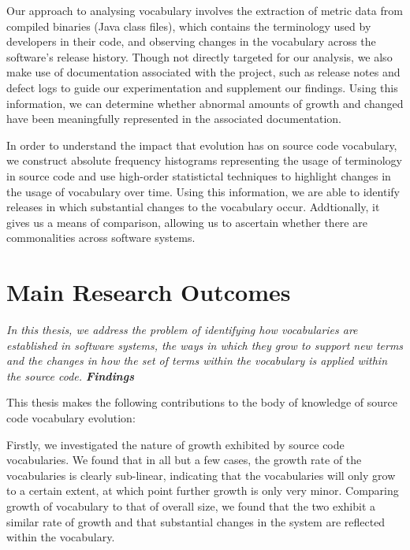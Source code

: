 

Our approach to analysing vocabulary involves the extraction of metric data from compiled binaries (Java class files), which contains the terminology used by developers in their code, and observing changes in the vocabulary across the software's release history. Though not directly targeted for our analysis, we also make use of documentation associated with the project, such as release notes and defect logs to guide our experimentation and supplement our findings. Using this information, we can determine whether abnormal amounts of growth and changed have been meaningfully represented in the associated documentation.

In order to understand the impact that evolution has on source code vocabulary, we construct absolute frequency histograms representing the usage of terminology in source code and use high-order statistictal techniques to highlight changes in the usage of vocabulary over time. Using this information, we are able to identify releases in which substantial changes to the vocabulary occur. Addtionally, it gives us a means of comparison, allowing us to ascertain whether there are commonalities across software systems.


\section{Main Research Outcomes} %
\label{sec:main_research_outcomes}

\emph{In this thesis, we address the problem of identifying how vocabularies are established in software systems, the ways in which they grow to support new terms and the changes in how the set of terms within the vocabulary is applied within the source code. \textbf{Findings}}

This thesis makes the following contributions to the body of knowledge of source code vocabulary evolution:

Firstly, we investigated the nature of growth exhibited by source code vocabularies. We found that in all but a few cases, the growth rate of the vocabularies is clearly sub-linear, indicating that the vocabularies will only grow to a certain extent, at which point further growth is only very minor. Comparing growth of vocabulary to that of overall size, we found that the two exhibit a similar rate of growth and that substantial changes in the system are reflected within the vocabulary.

